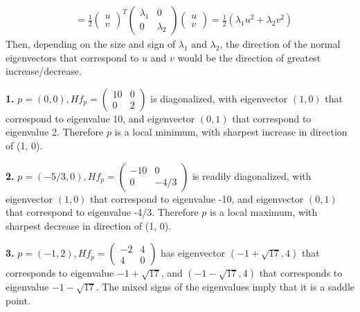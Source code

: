 \documentclass[a4paper, 12pt]{article}
\begin{document}
\begin{solution}
\begin{align*}
                    & = \frac{1}{2} \begin{pmatrix}
                                        u \\ v
                                    \end{pmatrix}^T \begin{pmatrix}
                                                        \lambda_1 & 0         \\
                                                        0         & \lambda_2
                                                    \end{pmatrix} \begin{pmatrix}
                                                                      u \\v
                                                                  \end{pmatrix} = \frac{1}{2} (\lambda_1 u^2 + \lambda_2 v^2)
    \end{align*}
    Then, depending on the size and sign of $\lambda_1$ and $\lambda_2$, the direction of the normal eigenvectors that correspond to $u$ and $v$ would be the direction of greatest increase/decrease.

    \textbf{1.} $p = (0, 0), Hf_p = \begin{pmatrix}
            10 & 0 \\
            0  & 2
        \end{pmatrix}$ is diagonalized, with eigenvector $(1, 0)$ that correspond to eigenvalue 10, and eigenvector $(0, 1)$ that correspond to eigenvalue 2. Therefore $p$ is a local minimum, with sharpest increase in direction of (1, 0).

    \textbf{2.} $p = (-5/3, 0),
        Hf_p = \begin{pmatrix}
            - 10 & 0 \\
            0 & -4/3
        \end{pmatrix}
    $ is readily diagonalized, with eigenvector $(1, 0)$ that correspond to eigenvalue -10, and eigenvector $(0, 1)$ that correspond to eigenvalue -4/3. Therefore $p$ is a local maximum, with sharpest decrease in direction of (1, 0).
    

    \textbf{3.} $p = (-1, 2), Hf_p = \begin{pmatrix}
            -2 & 4 \\
            4  & 0
        \end{pmatrix}$ has eigenvector $(-1 + \sqrt{17}, 4)$ that corresponds to eigenvalue $-1 + \sqrt{17}$, and $(-1 - \sqrt{17}, 4)$ that corresponds to eigenvalue $- 1 - \sqrt{17}$. The mixed signs of the eigenvalues imply that it is a saddle point.


\end{solution}
\end{document}
